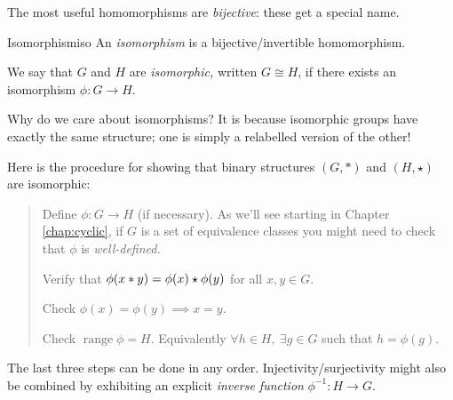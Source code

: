 
The most useful homomorphisms are \emph{bijective}: these get a special name.

\begin{defn}{Isomorphism}{iso}
An \emph{isomorphism} is a bijective/invertible homomorphism.\footnotemark\par
We say that $G$ and $H$ are \emph{isomorphic,} written $G\cong H$, if there exists an isomorphism $\phi:G\to H$.
\end{defn}

Why do we care about isomorphisms? It is because isomorphic groups have exactly the same structure; one is simply a relabelled version of the other!\smallbreak

Here is the procedure for showing that binary structures $(G,*)$ and $(H,\star)$ are isomorphic:
\begin{quote}
\begin{description}\itemsep2pt
  \item[\normalfont\emph{Definition}:] Define $\phi:G\to H$ (if necessary). As we'll see starting in Chapter \ref{chap:cyclic}, if $G$ is a set of equivalence classes you might need to check that $\phi$ is \emph{well-defined.}
  \item[\normalfont\emph{Homomorphism}:] Verify that $\phi(x\mathbin{\ast} y)=\phi(x)\mathbin{\star}\phi(y)$ for all $x,y\in G$.
  \item[\normalfont\emph{Injectivity/1--1}:] Check $\phi(x)=\phi(y)\implies x=y$.
  \item[\normalfont\emph{Surjectivity/onto}:] Check $\operatorname{range}\phi=H$. Equivalently $\forall h\in H,\ \exists g\in G$ such that $h=\phi(g)$.
\end{description}
\end{quote}

The last three steps can be done in any order. Injectivity/surjectivity might also be combined by exhibiting an explicit \emph{inverse function} $\phi^{-1}:H\to G$.


\goodbreak

